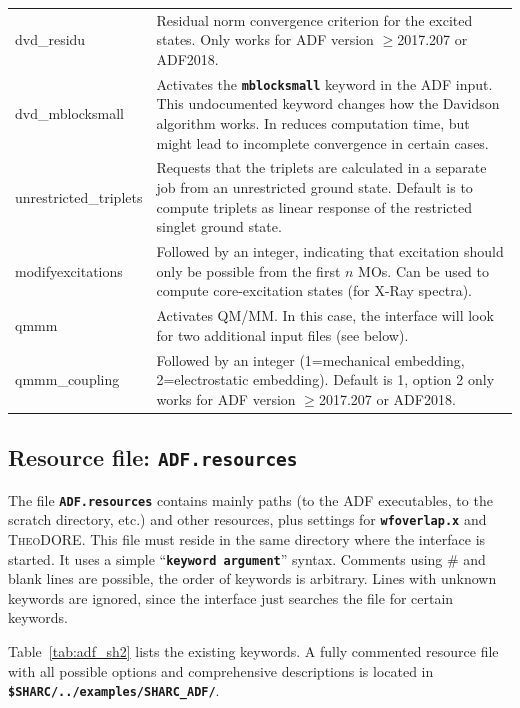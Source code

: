 \documentclass[a4paper,10pt,DIV=15,openany]{scrbook}
\newcommand{\ttt}[1]{\textbf{\texttt{#1}}}
\begin{document}
\begin{table}
\begin{tabular}{>{\ttfamily}lp{12cm}}
\\
dvd\_residu             &Residual norm convergence criterion for the excited states. Only works for ADF version $\geq$2017.207 or ADF2018.
\\
dvd\_mblocksmall        &Activates the \ttt{mblocksmall} keyword in the ADF input. This undocumented keyword changes how the Davidson algorithm works. In reduces computation time, but might lead to incomplete convergence in certain cases.
\\
unrestricted\_triplets  &Requests that the triplets are calculated in a separate job from an unrestricted ground state. Default is to compute triplets as linear response of the restricted singlet ground state.
\\
modifyexcitations       &Followed by an integer, indicating that excitation should only be possible from the first $n$ MOs. Can be used to compute core-excitation states (for X-Ray spectra).
\\
qmmm                    &Activates QM/MM. In this case, the interface will look for two additional input files (see below).
\\
qmmm\_coupling          &Followed by an integer (1=mechanical embedding, 2=electrostatic embedding). Default is 1, option 2 only works for ADF version $\geq$2017.207 or ADF2018.\\
  \hline
  \end{tabular}
\end{table}

\subsection{Resource file: \ttt{ADF.resources}}

The file \ttt{ADF.resources} contains mainly paths (to the \textsc{ADF} executables, to the scratch directory, etc.) and other resources, plus settings for \ttt{wfoverlap.x} and \textsc{TheoDORE}. This file must reside in the same directory where the interface is started. It uses a simple ``\ttt{keyword argument}'' syntax. Comments using \# and blank lines are possible, the order of keywords is arbitrary. Lines with unknown keywords are ignored, since the interface just searches the file for certain keywords.

Table~\ref{tab:adf_sh2} lists the existing keywords.
A fully commented resource file with all possible options and comprehensive descriptions is located in \ttt{\$SHARC/../examples/SHARC\_ADF/}.
\end{document}
